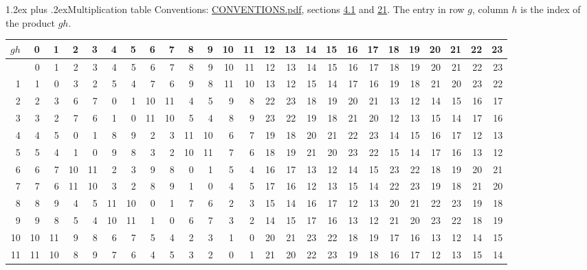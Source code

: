 \documentclass[10pt,a4paper]{article}
\makeatletter
\renewcommand\section{\@startsection{section}{1}{\z@}{-3ex plus -1ex minus -.2ex}%
  {1.2ex plus .2ex}{\normalfont\large\sffamily\bfseries\color{parttitle}}}
\numberwithin{equation}{section}
\makeatother
\begin{document}
\section{Multiplication table}\label{s:multiplication}
Conventions: \href{../../CONVENTIONS.pdf}{CONVENTIONS.pdf}, sections \href{../../../rotation/CONVENTIONS.pdf\#conv.4.1}{4.1} and \href{../../CONVENTIONS.pdf\#conv.21}{21}.
The entry in row $g$, column $h$ is the index of the product $gh$.
{\normalsize\setlength{\tabcolsep}{0.1em}\setlength{\LTleft}{-8pt plus 1fill}\setlength{\LTright}{-8pt plus 1fill}\begin{longtable}{@{}r|rrrrrrrrrrrrrrrrrrrrrrrr@{}}\toprule
$gh$ & 0 & 1 & 2 & 3 & 4 & 5 & 6 & 7 & 8 & 9 & 10 & 11 & 12 & 13 & 14 & 15 & 16 & 17 & 18 & 19 & 20 & 21 & 22 & 23\\\midrule\endhead
\bottomrule\endfoot\endlastfoot
0 & 0 & 1 & 2 & 3 & 4 & 5 & 6 & 7 & 8 & 9 & 10 & 11 & 12 & 13 & 14 & 15 & 16 & 17 & 18 & 19 & 20 & 21 & 22 & 23\\*
1 & 1 & 0 & 3 & 2 & 5 & 4 & 7 & 6 & 9 & 8 & 11 & 10 & 13 & 12 & 15 & 14 & 17 & 16 & 19 & 18 & 21 & 20 & 23 & 22\\
2 & 2 & 3 & 6 & 7 & 0 & 1 & 10 & 11 & 4 & 5 & 9 & 8 & 22 & 23 & 18 & 19 & 20 & 21 & 13 & 12 & 14 & 15 & 16 & 17\\
3 & 3 & 2 & 7 & 6 & 1 & 0 & 11 & 10 & 5 & 4 & 8 & 9 & 23 & 22 & 19 & 18 & 21 & 20 & 12 & 13 & 15 & 14 & 17 & 16\\
4 & 4 & 5 & 0 & 1 & 8 & 9 & 2 & 3 & 11 & 10 & 6 & 7 & 19 & 18 & 20 & 21 & 22 & 23 & 14 & 15 & 16 & 17 & 12 & 13\\
5 & 5 & 4 & 1 & 0 & 9 & 8 & 3 & 2 & 10 & 11 & 7 & 6 & 18 & 19 & 21 & 20 & 23 & 22 & 15 & 14 & 17 & 16 & 13 & 12\\
6 & 6 & 7 & 10 & 11 & 2 & 3 & 9 & 8 & 0 & 1 & 5 & 4 & 16 & 17 & 13 & 12 & 14 & 15 & 23 & 22 & 18 & 19 & 20 & 21\\
7 & 7 & 6 & 11 & 10 & 3 & 2 & 8 & 9 & 1 & 0 & 4 & 5 & 17 & 16 & 12 & 13 & 15 & 14 & 22 & 23 & 19 & 18 & 21 & 20\\
8 & 8 & 9 & 4 & 5 & 11 & 10 & 0 & 1 & 7 & 6 & 2 & 3 & 15 & 14 & 16 & 17 & 12 & 13 & 20 & 21 & 22 & 23 & 19 & 18\\
9 & 9 & 8 & 5 & 4 & 10 & 11 & 1 & 0 & 6 & 7 & 3 & 2 & 14 & 15 & 17 & 16 & 13 & 12 & 21 & 20 & 23 & 22 & 18 & 19\\
10 & 10 & 11 & 9 & 8 & 6 & 7 & 5 & 4 & 2 & 3 & 1 & 0 & 20 & 21 & 23 & 22 & 18 & 19 & 17 & 16 & 13 & 12 & 14 & 15\\
11 & 11 & 10 & 8 & 9 & 7 & 6 & 4 & 5 & 3 & 2 & 0 & 1 & 21 & 20 & 22 & 23 & 19 & 18 & 16 & 17 & 12 & 13 & 15 & 14\\

\end{longtable}}
\end{document}
